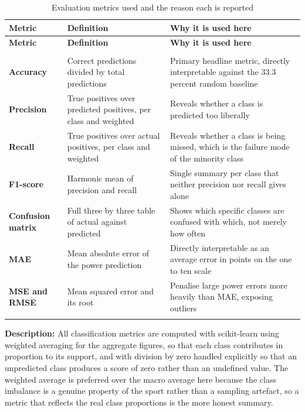 \renewcommand{\arraystretch}{1.25}
\small
\begin{longtable}{|>{\bfseries}p{3.0cm}|p{4.4cm}|p{6.2cm}|}
\hline
\textbf{Metric} & \textbf{Definition} & \textbf{Why it is used here} \\ \hline
\endfirsthead
\hline
\textbf{Metric} & \textbf{Definition} & \textbf{Why it is used here} \\ \hline
\endhead
\hline
\multicolumn{3}{r}{\textit{Continued on next page}} \\
\hline
\endfoot
\hline
\endlastfoot
Accuracy & Correct predictions divided by total predictions & Primary headline metric, directly interpretable against the 33.3 percent random baseline \\ \hline
Precision & True positives over predicted positives, per class and weighted & Reveals whether a class is predicted too liberally \\ \hline
Recall & True positives over actual positives, per class and weighted & Reveals whether a class is being missed, which is the failure mode of the minority class \\ \hline
F1-score & Harmonic mean of precision and recall & Single summary per class that neither precision nor recall gives alone \\ \hline
Confusion matrix & Full three by three table of actual against predicted & Shows which specific classes are confused with which, not merely how often \\ \hline
MAE & Mean absolute error of the power prediction & Directly interpretable as an average error in points on the one to ten scale \\ \hline
MSE and RMSE & Mean squared error and its root & Penalise large power errors more heavily than MAE, exposing outliers \\ \hline
\caption{Evaluation metrics used and the reason each is reported}
\label{tab:metrics}
\end{longtable}
\normalsize

\noindent
\textbf{Description:} All classification metrics are computed with scikit-learn using weighted averaging for the aggregate figures, so that each class contributes in proportion to its support, and with division by zero handled explicitly so that an unpredicted class produces a score of zero rather than an undefined value. The weighted average is preferred over the macro average here because the class imbalance is a genuine property of the sport rather than a sampling artefact, so a metric that reflects the real class proportions is the more honest summary.

